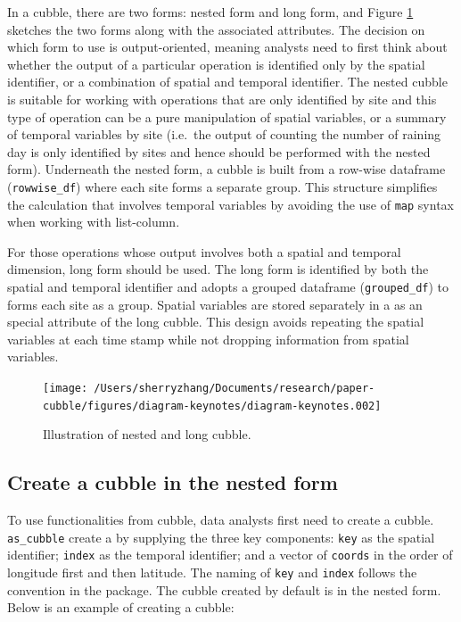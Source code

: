 \documentclass[
]{jss}
\begin{document}
In a cubble, there are two forms: nested form and long form, and Figure
\ref{fig:illu-cubble} sketches the two forms along with the associated
attributes. The decision on which form to use is output-oriented,
meaning analysts need to first think about whether the output of a
particular operation is identified only by the spatial identifier, or a
combination of spatial and temporal identifier. The nested cubble is
suitable for working with operations that are only identified by site
and this type of operation can be a pure manipulation of spatial
variables, or a summary of temporal variables by site (i.e.~the output
of counting the number of raining day is only identified by sites and
hence should be performed with the nested form). Underneath the nested
form, a cubble is built from a row-wise dataframe (\texttt{rowwise\_df})
where each site forms a separate group. This structure simplifies the
calculation that involves temporal variables by avoiding the use of
\texttt{map} syntax when working with list-column.

For those operations whose output involves both a spatial and temporal
dimension, long form should be used. The long form is identified by both
the spatial and temporal identifier and adopts a grouped dataframe
(\texttt{grouped\_df}) to forms each site as a group. Spatial variables
are stored separately in a  as an special attribute of the
long cubble. This design avoids repeating the spatial variables at each
time stamp while not dropping information from spatial variables.

\begin{CodeChunk}
\begin{figure}

{\centering \texttt{[image: /Users/sherryzhang/Documents/research/paper-cubble/figures/diagram-keynotes/diagram-keynotes.002]} 

}

\caption[Illustration of nested and long cubble]{Illustration of nested and long cubble.}\label{fig:illu-cubble}
\end{figure}
\end{CodeChunk}

\hypertarget{create-a-cubble-in-the-nested-form}{%
\subsection{Create a cubble in the nested
form}\label{create-a-cubble-in-the-nested-form}}

To use functionalities from cubble, data analysts first need to create a
cubble. \texttt{as\_cubble} create a  by supplying the three
key components: \texttt{key} as the spatial identifier; \texttt{index}
as the temporal identifier; and a vector of \texttt{coords} in the order
of longitude first and then latitude. The naming of \texttt{key} and
\texttt{index} follows the convention in the  package. The
cubble created by default is in the nested form. Below is an example of
creating a cubble: \newline
\end{document}
